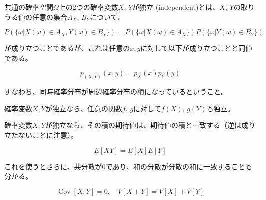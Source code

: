 \documentclass[uplatex,dvipdfmx]{jlreq}
\newcommand\term[1]{\textsf{#1}}
\begin{document}
共通の確率空間$\Omega$上の2つの確率変数$X$, $Y$が\term{独立 (independent)}とは、$X$, $Y$の取りうる値の任意の集合$A_X$, $B_Y$について、

\begin{equation}
    P(\{\omega|X(\omega)\in A_X, Y(\omega)\in B_Y\}) =
    P(\{\omega|X(\omega)\in A_X\})P(\{\omega|Y(\omega)\in B_Y\})
\end{equation}

が成り立つことであるが、これは任意の$x, y$に対して以下が成り立つことと同値である。

\begin{equation}
    p_{(X, Y)}(x, y) = p_X(x) p_Y(y)
\end{equation}

すなわち、同時確率分布が周辺確率分布の積になっているということ。

確率変数$X, Y$が独立なら、任意の関数$f$, $g$に対して$f(X)$, $g(Y)$も独立。

確率変数$X, Y$が独立なら、その積の期待値は、期待値の積と一致する（逆は成り立たないことに注意）。

\begin{equation}
    E[XY] = E[X]E[Y]
\end{equation}

これを使うとさらに、共分散が0であり、和の分散が分散の和に一致することも分かる。

\begin{equation}
    \operatorname{Cov}[X, Y] = 0,\quad V[X + Y] = V[X] + V[Y]
\end{equation}
\end{document}
